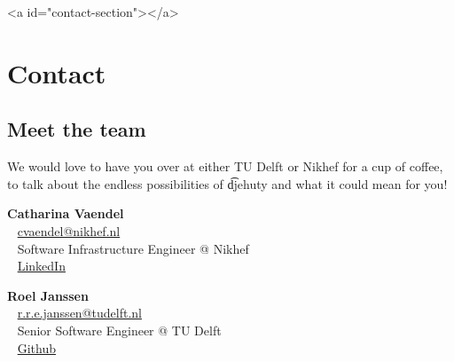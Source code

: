 \ifdefined\HCode
\begin{html}
<a id="contact-section"></a>
\end{html}
\fi
\chapter*{Contact}

\section*{Meet the team}

We would love to have you over at either TU Delft or Nikhef for a cup
of coffee, to talk about the endless possibilities of \t{djehuty} and
what it could mean for you!

\textbf{Catharina Vaendel}\\~
\href{mailto:cvaendel@nikhef.nl}{cvaendel@nikhef.nl}\\~
Software Infrastructure Engineer @ Nikhef\\~
\href{https://www.linkedin.com/in/catharinavaendel}{LinkedIn}

\textbf{Roel Janssen}\\~
\href{mailto:r.r.e.janssen@tudelft.nl}{r.r.e.janssen@tudelft.nl}\\~
Senior Software Engineer @ TU Delft\\~
\href{https://github.com/roelj}{Github}
